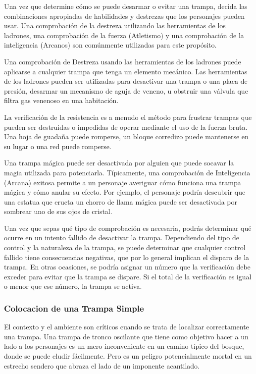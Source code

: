 \documentclass[a4paper,twocolumn,openany,10pt]{dndbook}
\begin{document}
Una vez que determine cómo se puede desarmar o evitar una trampa, decida las combinaciones apropiadas de habilidades y destrezas
que los personajes pueden usar. Una comprobación de la destreza utilizando las herramientas de los ladrones, una comprobación de
la fuerza (Atletismo) y una comprobación de la inteligencia (Arcanos) son comúnmente utilizadas para este propósito.

Una comprobación de Destreza usando las herramientas de los ladrones puede aplicarse a cualquier trampa que tenga un elemento
mecánico. Las herramientas de los ladrones pueden ser utilizadas para desactivar una trampa o una placa de presión, desarmar un
mecanismo de aguja de veneno, u obstruir una válvula que filtra gas venenoso en una habitación.

La verificación de la resistencia es a menudo el método para frustrar trampas que pueden ser destruidas o impedidas de operar
mediante el uso de la fuerza bruta. Una hoja de guadaña puede romperse, un bloque corredizo puede mantenerse en su lugar o una
red puede romperse.

Una trampa mágica puede ser desactivada por alguien que puede socavar la magia utilizada para potenciarla. Típicamente, una
comprobación de Inteligencia (Arcana) exitosa permite a un personaje averiguar cómo funciona una trampa mágica y cómo anular su
efecto. Por ejemplo, el personaje podría descubrir que una estatua que eructa un chorro de llama mágica puede ser desactivada por
sombrear uno de sus ojos de cristal.

Una vez que sepas qué tipo de comprobación es necesaria, podrás determinar qué ocurre en un intento fallido de desactivar la
trampa. Dependiendo del tipo de control y la naturaleza de la trampa, se puede determinar que cualquier control fallido tiene
consecuencias negativas, que por lo general implican el disparo de la trampa. En otras ocasiones, se podría asignar un número que
la verificación debe exceder para evitar que la trampa se dispare. Si el total de la verificación es igual o menor que ese
número, la trampa se activa. 

\subsubsection*{Colocacion de una Trampa Simple}
El contexto y el ambiente son críticos cuando se trata de localizar correctamente una trampa. Una trampa de tronco oscilante que
tiene como objetivo hacer a un lado a los personajes es un mero inconveniente en un camino típico del bosque, donde se puede
eludir fácilmente. Pero es un peligro potencialmente mortal en un estrecho sendero que abraza el lado de un imponente acantilado.
\end{document}
